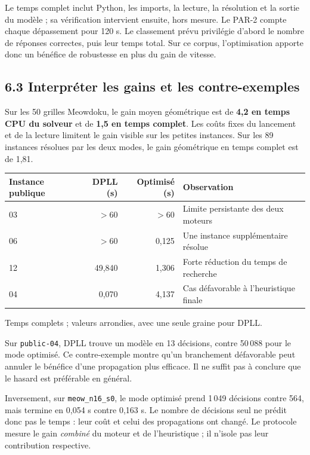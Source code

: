 \documentclass[11pt,a4paper]{article}
\begin{document}
Le temps complet inclut Python, les imports, la lecture, la résolution et
la sortie du modèle ; sa vérification intervient ensuite, hors mesure.
Le PAR-2 compte chaque dépassement pour 120 s. Le classement prévu
privilégie d'abord le nombre de réponses correctes, puis leur temps total.
Sur ce corpus, l'optimisation apporte donc un bénéfice de robustesse
en plus du gain de vitesse.

\newpage
\subsection*{6.3 Interpréter les gains et les contre-exemples}

Sur les 50 grilles Meowdoku, le gain moyen géométrique est de
\textbf{4,2 en temps CPU du solveur} et de \textbf{1,5 en temps complet}.
Les coûts fixes du lancement et de la lecture limitent le gain visible
sur les petites instances. Sur les 89 instances résolues par les deux
modes, le gain géométrique en temps complet est de 1,81.

\begin{center}\small
\begin{tabular}{lrrl}
\toprule
Instance publique & DPLL (s) & Optimisé (s) & Observation \\
\midrule
03 & $>60$ & $>60$ & Limite persistante des deux moteurs \\
06 & $>60$ & 0,125 & Une instance supplémentaire résolue \\
12 & 49,840 & 1,306 & Forte réduction du temps de recherche \\
04 & 0,070 & 4,137 & Cas défavorable à l'heuristique finale \\
\bottomrule
\end{tabular}
\end{center}
{\small Temps complets ; valeurs arrondies, avec une seule graine pour DPLL.}

Sur \texttt{public-04}, DPLL trouve un modèle en 13 décisions, contre
50\,088 pour le mode optimisé. Ce contre-exemple montre qu'un branchement
défavorable peut annuler le bénéfice d'une propagation plus efficace.
Il ne suffit pas à conclure que le hasard est préférable en général.

Inversement, sur \texttt{meow\_n16\_s0}, le mode optimisé prend
1\,049 décisions contre 564, mais termine en 0,054 s contre 0,163 s.
Le nombre de décisions seul ne prédit donc pas le temps : leur coût
et celui des propagations ont changé. Le protocole mesure le gain
\emph{combiné} du moteur et de l'heuristique ; il n'isole pas leur
contribution respective.
\end{document}

